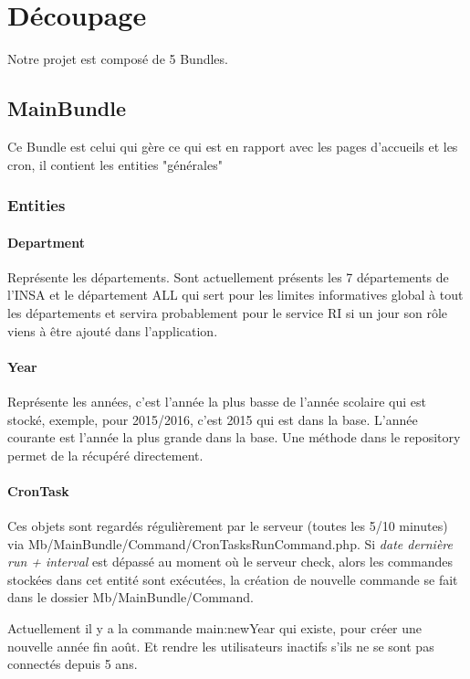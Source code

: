 
\chapter{Découpage}
Notre projet est composé de 5 Bundles.

\section{MainBundle}
Ce Bundle est celui qui gère ce qui est en rapport avec les pages d'accueils et les cron, il contient les entities "générales"

\subsection{Entities}
\subsubsection{Department}
Représente les départements. Sont actuellement présents les 7 départements de l'INSA et le département ALL qui sert pour les limites informatives global à tout les départements et servira probablement pour le service RI si un jour son rôle viens à être ajouté dans l'application.

\subsubsection{Year}
Représente les années, c'est l'année la plus basse de l'année scolaire qui est stocké, exemple, pour 2015/2016, c'est 2015 qui est dans la base. L'année courante est l'année la plus grande dans la base. Une méthode dans le repository permet de la récupéré directement.

\subsubsection{CronTask}

Ces objets sont regardés régulièrement par le serveur (toutes les 5/10 minutes) via Mb/MainBundle/Command/CronTasksRunCommand.php. 
Si \textit{date dernière run + interval}  est dépassé au moment où le serveur check, alors les commandes stockées dans cet entité sont exécutées, la création de nouvelle commande se fait dans le dossier Mb/MainBundle/Command. 

Actuellement il y a la commande main:newYear qui existe, pour créer une nouvelle année fin août. Et rendre les utilisateurs inactifs s'ils ne se sont pas connectés depuis 5 ans.


